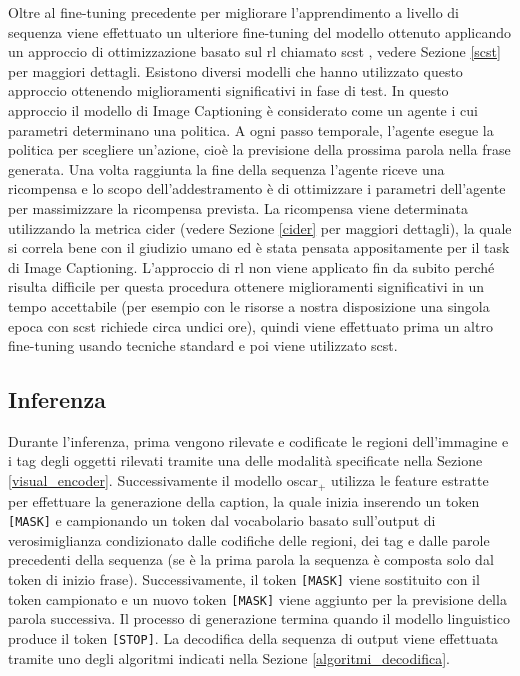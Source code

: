  
Oltre al fine-tuning precedente per migliorare l'apprendimento a livello di sequenza viene effettuato un ulteriore fine-tuning del modello ottenuto applicando un approccio di ottimizzazione basato sul \acrlong{rl} chiamato \acrfull{scst} \cite{rennie2017self}, vedere Sezione \ref{scst} per maggiori dettagli. Esistono diversi modelli \cite{anderson2018bottom, zhou2020unified, li2020oscar, zhang2021vinvl} che hanno utilizzato questo approccio ottenendo miglioramenti significativi in fase di test. In questo approccio il modello di Image Captioning è considerato come un agente i cui parametri determinano una politica.
A ogni passo temporale, l'agente esegue la politica per scegliere un'azione, cioè la previsione della prossima parola nella frase generata. Una volta raggiunta la fine della sequenza l'agente riceve una ricompensa e lo scopo dell'addestramento è di ottimizzare i parametri dell'agente per massimizzare la ricompensa prevista.
La ricompensa viene determinata utilizzando la metrica \acrshort{cider} (vedere Sezione \ref{cider} per maggiori dettagli), la quale si correla bene con il giudizio umano ed è stata pensata appositamente per il task di Image Captioning.
L'approccio di \acrlong{rl} non viene applicato fin da subito perché risulta difficile per questa procedura ottenere miglioramenti significativi in un tempo accettabile (per esempio con le risorse a nostra disposizione una singola epoca con \acrshort{scst} richiede circa undici ore), quindi viene effettuato prima un altro fine-tuning usando tecniche standard e poi viene utilizzato \acrshort{scst}.
\subsection{Inferenza}
Durante l'inferenza, prima vengono rilevate e codificate le regioni dell'immagine e i tag degli oggetti rilevati tramite una delle modalità specificate nella Sezione \ref{visual_encoder}. Successivamente il modello \acrshort{oscar}$_+$ utilizza le feature estratte per effettuare la generazione della caption, la quale inizia inserendo un token \texttt{[MASK]} e campionando un token dal vocabolario basato sull'output di verosimiglianza condizionato dalle codifiche delle regioni, dei tag e dalle parole precedenti della sequenza (se è la prima parola la sequenza è composta solo dal token di inizio frase). Successivamente, il token \texttt{[MASK]} viene sostituito con il token campionato e un nuovo token \texttt{[MASK]} viene aggiunto per la previsione della parola successiva. Il processo di generazione termina quando il modello linguistico produce il token \texttt{[STOP]}. La decodifica della sequenza di output viene effettuata tramite uno degli algoritmi indicati nella Sezione \ref{algoritmi_decodifica}.